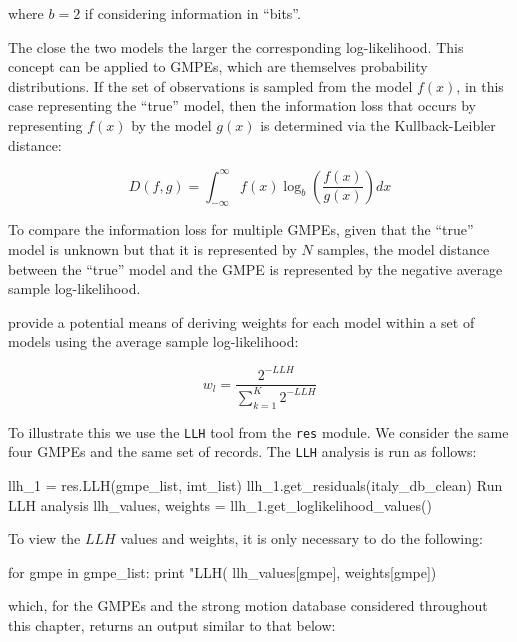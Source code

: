 \noindent where $b=2$ if considering information in ``bits''.

The close the two models the larger the corresponding log-likelihood. This concept can be applied to GMPEs, which are themselves probability distributions. If the set of observations is sampled from the model $f \left( x \right)$, in this case representing the ``true'' model, then the information loss that occurs by representing $f \left( x \right)$ by the model $g \left( x \right)$ is determined via the Kullback-Leibler distance:

\begin{equation}
D \left( {f, g} \right) = \int_{-\infty}^{\infty} f \left( x \right) \log_b \left( {\frac{f \left( x \right)}{g \left( x \right)}} \right) dx
\end{equation}

To compare the information loss for multiple GMPEs, given that the ``true'' model is unknown but that it is represented by $N$ samples, the model distance between the ``true'' model and the GMPE is represented by the negative average sample log-likelihood.

\cite{Scherbaum_etal2009} provide a potential means of deriving weights for each model within a set of models using the average sample log-likelihood:  

\begin{equation}
w_l = \frac{2^{-LLH}}{\sum_{k=1}^{K}2 ^{-LLH}}
\end{equation}


To illustrate this we use the \verb=LLH= tool from the \verb=res= module. We consider the same four GMPEs and the same set of records. The \verb=LLH= analysis is run as follows:

\begin{python}[frame=single]
llh_1 = res.LLH(gmpe_list, imt_list)
llh_1.get_residuals(italy_db_clean)
 Run LLH analysis
llh_values, weights = llh_1.get_loglikelihood_values()
\end{python}

To view the $LLH$ values and weights, it is only necessary to do the following:

\begin{python}
for gmpe in gmpe_list:
    print "LLH(%
                                               llh_values[gmpe],     
                                               weights[gmpe])
\end{python}

\noindent which, for the GMPEs and the strong motion database considered throughout this chapter, returns an output similar to that below:

